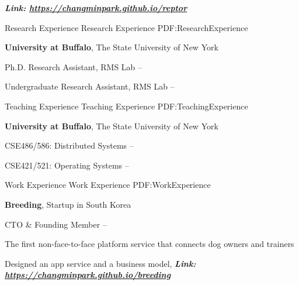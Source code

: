 \documentclass[letterpaper,MMMyyyy,nonstopmode]{simpleresumecv}
\begin{document}
\begin{Body}
\hspace{2ex}
\textbf{\textit{Link: \href{https://changminpark.github.io/reptor}{https://changminpark.github.io/reptor}}}
\hfill



\vspace{-0.5ex}
\Section
{Research Experience}
{Research Experience}
{PDF:ResearchExperience}

\Entry
\textbf{University at Buffalo}, The State University of New York

\Gap
\BulletItem
Ph.D. Research Assistant, RMS Lab
\hfill
{} --

\Gap
\BulletItem
Undergraduate Research Assistant, RMS Lab
\hfill
{} --


\vspace{-0.5ex}
\Section
{Teaching Experience}
{Teaching Experience}
{PDF:TeachingExperience}

\Entry
\textbf{University at Buffalo}, The State University of New York

\Gap
\BulletItem
CSE486/586: Distributed Systems
\hfill
{} --

\Gap
\BulletItem
CSE421/521: Operating Systems
\hfill
{} --



\vspace{-0.5ex}
\Section
{Work Experience}
{Work Experience}
{PDF:WorkExperience}

\Entry
\textbf{Breeding}, Startup in South Korea

\Gap
\BulletItem
CTO \& Founding Member
\hfill
{} --

\Gap
\BulletItem
The first non-face-to-face platform service that connects dog owners and trainers
\hfill

\Gap
\BulletItem
Designed an app service and a business model, 
\textbf{\textit{Link: \href{https://changminpark.github.io/breeding}
{https://changminpark.github.io/breeding}}}






\end{Body}
\end{document}
